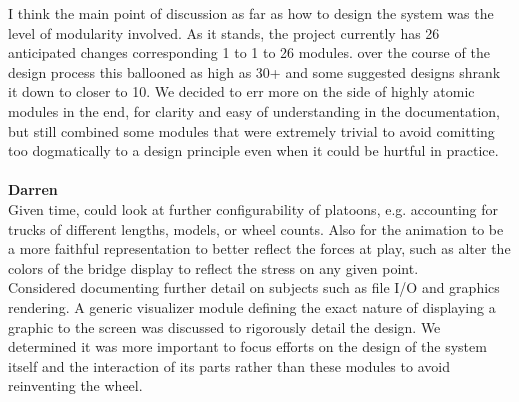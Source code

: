 \documentclass[12pt, titlepage]{article}
\begin{document}
I think the main point of discussion as far as how to design the system was the level of modularity involved. As it stands, the project currently has 26 anticipated changes
corresponding 1 to 1 to 26 modules. over the course of the design process this ballooned as high as 30+ and some suggested designs shrank it down to closer to 10. We decided
to err more on the side of highly atomic modules in the end, for clarity and easy of understanding in the documentation, but still combined some modules that were extremely
trivial to avoid comitting too dogmatically to a design principle even when it could be hurtful in practice.\\\\

\noindent\textbf{Darren}\\
Given time, could look at further configurability of platoons, e.g. accounting for trucks of different lengths, models, or wheel counts. Also for the animation to be a more 
faithful representation to better reflect the forces at play, such as alter the colors of the bridge display to reflect the stress on any given point.\\

Considered documenting further detail on subjects such as file I/O and graphics rendering. A generic visualizer module defining the exact nature of displaying 
a graphic to the screen was discussed to rigorously detail the design. We determined it was more important to focus efforts on the design of the system itself and the 
interaction of its parts rather than these modules to avoid reinventing the wheel.\\\\
\end{document}
